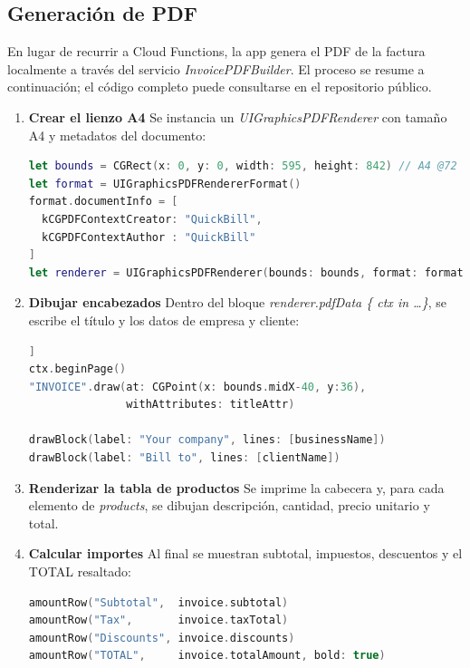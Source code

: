 \subsection{Generación de PDF}

\begin{large}

En lugar de recurrir a Cloud Functions, la app genera el PDF de la factura localmente a través del servicio \textit{InvoicePDFBuilder}. El proceso se resume a continuación; el código completo puede consultarse en el repositorio público.

\begin{enumerate}
  \item \textbf{Crear el lienzo A4}\newline
  Se instancia un \textit{UIGraphicsPDFRenderer} con tamaño A4 y metadatos del documento:
  \begin{lstlisting}[language=swift, basicstyle=\ttfamily\small]
let bounds = CGRect(x: 0, y: 0, width: 595, height: 842) // A4 @72 dpi
let format = UIGraphicsPDFRendererFormat()
format.documentInfo = [
  kCGPDFContextCreator: "QuickBill",
  kCGPDFContextAuthor : "QuickBill"
]
let renderer = UIGraphicsPDFRenderer(bounds: bounds, format: format)
  \end{lstlisting}

  \item \textbf{Dibujar encabezados}\newline
  Dentro del bloque \textit{renderer.pdfData \{ ctx in …\}}, se escribe el título y los datos de empresa y cliente:
  \begin{lstlisting}[language=swift, basicstyle=\ttfamily\small]]
ctx.beginPage()
"INVOICE".draw(at: CGPoint(x: bounds.midX-40, y:36),
               withAttributes: titleAttr)

drawBlock(label: "Your company", lines: [businessName])
drawBlock(label: "Bill to", lines: [clientName])
  \end{lstlisting}

  \item \textbf{Renderizar la tabla de productos}\newline
  Se imprime la cabecera y, para cada elemento de \textit{products}, se dibujan descripción, cantidad, precio unitario y total.

  \item \textbf{Calcular importes}\newline
  Al final se muestran subtotal, impuestos, descuentos y el TOTAL resaltado:
  \begin{lstlisting}[language=swift, basicstyle=\ttfamily\small]
amountRow("Subtotal",  invoice.subtotal)
amountRow("Tax",       invoice.taxTotal)
amountRow("Discounts", invoice.discounts)
amountRow("TOTAL",     invoice.totalAmount, bold: true)
  \end{lstlisting}


\end{enumerate}
\end{large}
